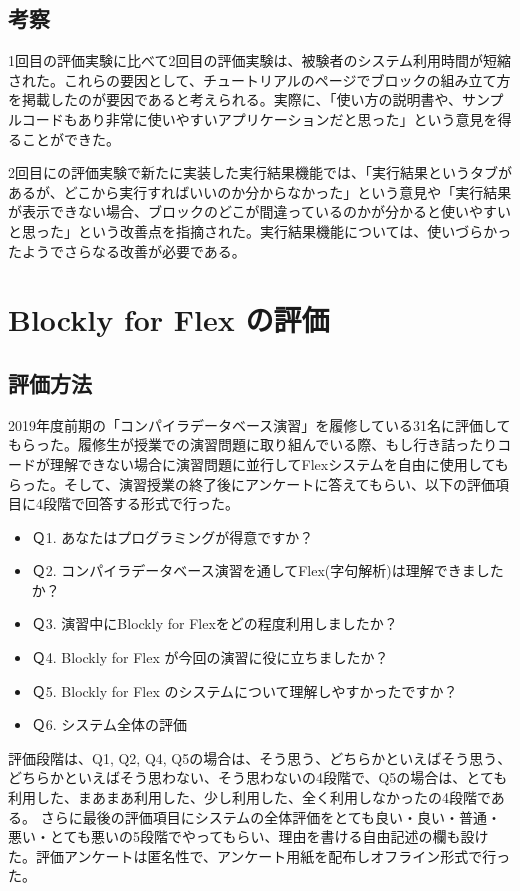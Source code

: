 \documentclass{risepaper}
\begin{document}
		\subsection{考察}
        
1回目の評価実験に比べて2回目の評価実験は、被験者のシステム利用時間が短縮された。これらの要因として、チュートリアルのページでブロックの組み立て方を掲載したのが要因であると考えられる。実際に、「使い方の説明書や、サンプルコードもあり非常に使いやすいアプリケーションだと思った」という意見を得ることができた。

2回目にの評価実験で新たに実装した実行結果機能では、「実行結果というタブがあるが、どこから実行すればいいのか分からなかった」という意見や「実行結果が表示できない場合、ブロックのどこが間違っているのかが分かると使いやすいと思った」という改善点を指摘された。実行結果機能については、使いづらかったようでさらなる改善が必要である。

   \section{Blockly for Flex の評価}
   
   		\subsection{評価方法}
        
2019年度前期の「コンパイラデータベース演習」を履修している31名に評価してもらった。履修生が授業での演習問題に取り組んでいる際、もし行き詰ったりコードが理解できない場合に演習問題に並行してFlexシステムを自由に使用してもらった。そして、演習授業の終了後にアンケートに答えてもらい、以下の評価項目に4段階で回答する形式で行った。
\begin{itemize}
\item Ｑ1. あなたはプログラミングが得意ですか？
\item Ｑ2. コンパイラデータベース演習を通してFlex(字句解析)は理解できましたか？
\item Ｑ3. 演習中にBlockly for Flexをどの程度利用しましたか？
\item Ｑ4. Blockly for Flex が今回の演習に役に立ちましたか？
\item Ｑ5. Blockly for Flex のシステムについて理解しやすかったですか？
\item Ｑ6. システム全体の評価
\end{itemize} 
評価段階は、Q1, Q2, Q4, Q5の場合は、そう思う、どちらかといえばそう思う、どちらかといえばそう思わない、そう思わないの4段階で、Q5の場合は、とても利用した、まあまあ利用した、少し利用した、全く利用しなかったの4段階である。
さらに最後の評価項目にシステムの全体評価をとても良い・良い・普通・悪い・とても悪いの5段階でやってもらい、理由を書ける自由記述の欄も設けた。評価アンケートは匿名性で、アンケート用紙を配布しオフライン形式で行った。
\end{document}
